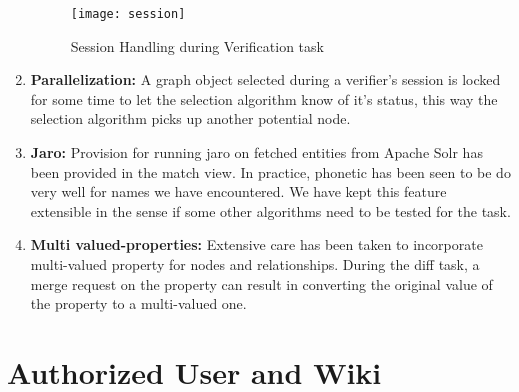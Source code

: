 \begin{enumerate}
\begin{figure}[H]
\begin{center}  
\texttt{[image: session]} 
\caption{Session Handling during Verification task}
\label{fig:session}
\end{center}
\end{figure}


\item \textbf{Parallelization:} A graph object selected during a verifier's session is locked for some time to let the selection algorithm know of it's status, this way the selection algorithm picks up another potential node.

\item \textbf{Jaro:} Provision for running jaro on fetched entities from Apache Solr has been provided in the match view. In practice, phonetic has been seen to be do very well for names we have encountered. We have kept this feature extensible in the sense if some other algorithms need to be tested for the task.

\item \textbf{Multi valued-properties:} Extensive care has been taken to incorporate multi-valued property for nodes and relationships. During the diff task, a merge request on the property can result in converting the original value of the property to a multi-valued one. 

\end{enumerate}





 

\section{Authorized User and Wiki}

